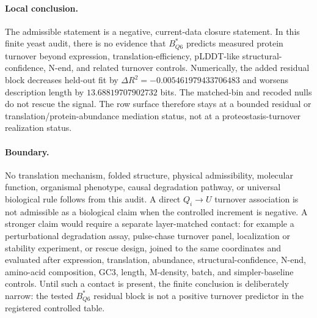 \paragraph{Local conclusion.}
The admissible statement is a negative, current-data closure statement. In this finite yeast audit, there is no evidence that $B^{\ast}_{Q6}$ predicts measured protein turnover beyond expression, translation-efficiency, pLDDT-like structural-confidence, N-end, and related turnover controls. Numerically, the added residual block decreases held-out fit by $\Delta R^2=-0.005461979433706483$ and worsens description length by $13.68819707902732$ bits. The matched-bin and recoded nulls do not rescue the signal. The row surface therefore stays at a bounded residual or translation/protein-abundance mediation status, not at a proteostasis-turnover realization status.

\paragraph{Boundary.}
No translation mechanism, folded structure, physical admissibility, molecular function, organismal phenotype, causal degradation pathway, or universal biological rule follows from this audit. A direct $Q_i \to U$ turnover association is not admissible as a biological claim when the controlled increment is negative. A stronger claim would require a separate layer-matched contact: for example a perturbational degradation assay, pulse-chase turnover panel, localization or stability experiment, or rescue design, joined to the same coordinates and evaluated after expression, translation, abundance, structural-confidence, N-end, amino-acid composition, GC3, length, M-density, batch, and simpler-baseline controls. Until such a contact is present, the finite conclusion is deliberately narrow: the tested $B^{\ast}_{Q6}$ residual block is not a positive turnover predictor in the registered controlled table.